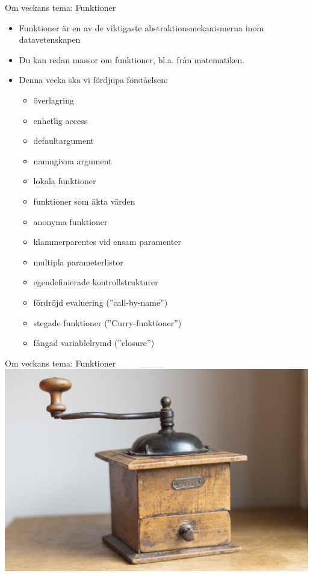 

\ifkompendium\else
\begin{SlideExtra}{Om veckans tema: Funktioner}
\begin{itemize}
  \item Funktioner är en av de viktigaste abstraktionsmekanismerna inom datavetenskapen
  \item Du kan redan massor om funktioner, bl.a. från matematiken.
  \item Denna vecka ska vi fördjupa förståelsen:
  \begin{itemize}
    \item överlagring
    \item enhetlig access
    \item defaultargument
    \item namngivna argument
    \item lokala funktioner
    \item funktioner som äkta värden
    \item anonyma funktioner
    \item klammerparentes vid ensam paramenter
    \item multipla parameterlistor
    \item egendefinierade kontrollstrukturer
    \item fördröjd evaluering (''call-by-name'')
    \item stegade funktioner (''Curry-funktioner'')
    \item fångad variablelrymd (''closure'')
    \end{itemize}
\end{itemize}  
\end{SlideExtra}

\begin{SlideExtra}{Om veckans tema: Funktioner}
  \includegraphics[width=1.0\textwidth]{../img/coffee-grinder}
\end{SlideExtra}
\fi


